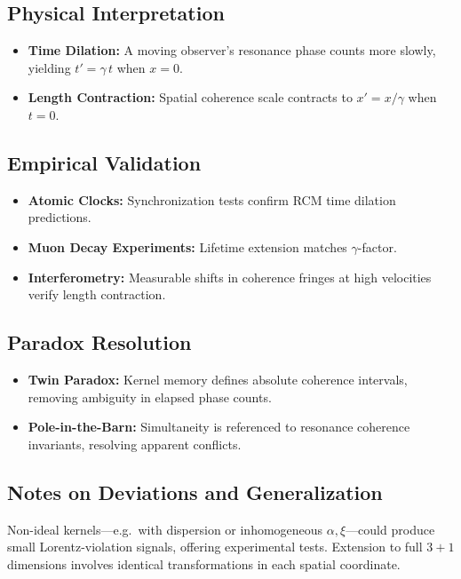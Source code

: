\subsection{Physical Interpretation}
\begin{itemize}
  \item \textbf{Time Dilation:} A moving observer’s resonance phase counts more slowly, yielding \(t' = \gamma\,t\) when \(x=0\).
  \item \textbf{Length Contraction:} Spatial coherence scale contracts to \(x' = x/\gamma\) when \(t=0\).
\end{itemize}

\subsection{Empirical Validation}
\begin{itemize}
  \item \textbf{Atomic Clocks:} Synchronization tests confirm RCM time dilation predictions.
  \item \textbf{Muon Decay Experiments:} Lifetime extension matches \(\gamma\)-factor.
  \item \textbf{Interferometry:} Measurable shifts in coherence fringes at high velocities verify length contraction.
\end{itemize}

\subsection{Paradox Resolution}
\begin{itemize}
  \item \textbf{Twin Paradox:} Kernel memory defines absolute coherence intervals, removing ambiguity in elapsed phase counts.
  \item \textbf{Pole-in-the-Barn:} Simultaneity is referenced to resonance coherence invariants, resolving apparent conflicts.
\end{itemize}

\subsection{Notes on Deviations and Generalization}
Non-ideal kernels—e.g.\ with dispersion or inhomogeneous \(\alpha,\xi\)—could produce small Lorentz-violation signals, offering experimental tests.  Extension to full \(3+1\) dimensions involves identical transformations in each spatial coordinate.

